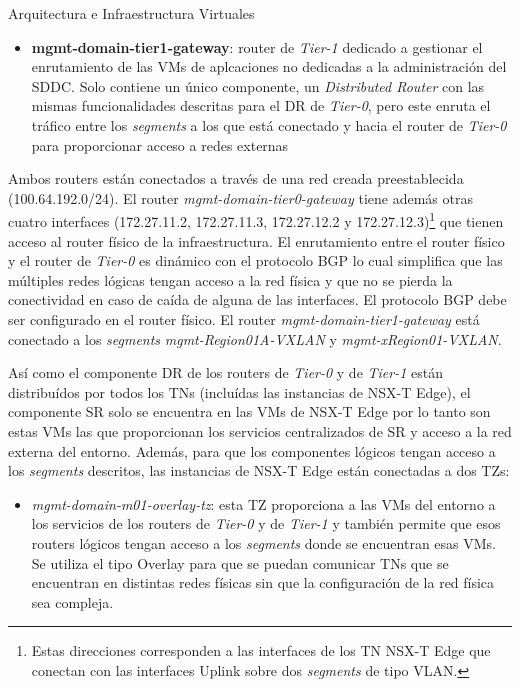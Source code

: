 \begin{subsection}{Arquitectura e Infraestructura Virtuales\cite{CFVirtInfraes}}
\begin{itemize}
\begin{itemize}
    \end{itemize}

    \item \textbf{mgmt-domain-tier1-gateway}: router de \textit{Tier-1} dedicado a gestionar el enrutamiento de las VMs de aplcaciones no dedicadas a la administración del SDDC. Solo contiene un único componente, un \textit{Distributed Router} con las mismas funcionalidades descritas para el DR de \textit{Tier-0}, pero este enruta el tráfico entre los \textit{segments} a los que está conectado y hacia el router de \textit{Tier-0} para proporcionar acceso a redes externas
  \end{itemize}

Ambos routers están conectados a través de una red creada preestablecida (100.64.192.0/24). El router \textit{mgmt-domain-tier0-gateway} tiene además otras cuatro interfaces (172.27.11.2, 172.27.11.3, 172.27.12.2 y 172.27.12.3)\footnote{Estas direcciones corresponden a las interfaces de los TN NSX-T Edge que conectan con las interfaces Uplink sobre dos \textit{segments} de tipo VLAN.} que tienen acceso al router físico de la infraestructura. El enrutamiento entre el router físico y el router de \textit{Tier-0} es dinámico con el protocolo BGP lo cual simplifica que las múltiples redes lógicas tengan acceso a la red física y que no se pierda la conectividad en caso de caída de alguna de las interfaces. El protocolo BGP debe ser configurado en el router físico. El router \textit{mgmt-domain-tier1-gateway} está conectado a los \textit{segments} \textit{mgmt-Region01A-VXLAN} y \textit{mgmt-xRegion01-VXLAN}.

Así como el componente DR de los routers de \textit{Tier-0} y de \textit{Tier-1} están distribuídos por todos los TNs (incluídas las instancias de NSX-T Edge), el componente SR solo se encuentra en las VMs de NSX-T Edge por lo tanto son estas VMs las que proporcionan los servicios centralizados de SR y acceso a la red externa del entorno. Además, para que los componentes lógicos tengan acceso a los \textit{segments} descritos, las instancias de NSX-T Edge están conectadas a dos TZs:
\begin{itemize}
  
  \item \textit{mgmt-domain-m01-overlay-tz}: esta TZ proporciona a las VMs del entorno a los servicios de los routers de \textit{Tier-0} y de \textit{Tier-1} y también permite que esos routers lógicos tengan acceso a los \textit{segments} donde se encuentran esas VMs. Se utiliza el tipo Overlay para que se puedan comunicar TNs que se encuentran en distintas redes físicas sin que la configuración de la red física sea compleja.
  

\end{itemize}
\end{subsection}
